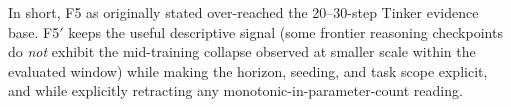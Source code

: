 In short, F5 as originally stated over-reached the 20--30-step Tinker evidence
base. F5$'$ keeps the useful descriptive signal (some frontier reasoning
checkpoints do \emph{not} exhibit the mid-training collapse observed at
smaller scale within the evaluated window) while making the horizon, seeding,
and task scope explicit, and while explicitly retracting any
monotonic-in-parameter-count reading.
